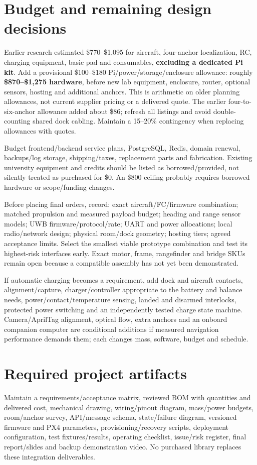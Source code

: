 \documentclass[10pt,letterpaper]{article}
\begin{document}
\section{Budget and remaining design decisions}
Earlier research estimated \$770--\$1,095 for aircraft, four-anchor localization, RC, charging equipment, basic pad and consumables, \textbf{excluding a dedicated Pi kit}. Add a provisional \$100--\$180 Pi/power/storage/enclosure allowance: roughly \textbf{\$870--\$1,275 hardware}, before new lab equipment, enclosure, router, optional sensors, hosting and additional anchors. This is arithmetic on older planning allowances, not current supplier pricing or a delivered quote. The earlier four-to-six-anchor allowance added about \$86; refresh all listings and avoid double-counting shared dock cabling. Maintain a 15--20\% contingency when replacing allowances with quotes.

Budget frontend/backend service plans, PostgreSQL, Redis, domain renewal, backups/log storage, shipping/taxes, replacement parts and fabrication. Existing university equipment and credits should be listed as borrowed/provided, not silently treated as purchased for \$0. An \$800 ceiling probably requires borrowed hardware or scope/funding changes.

Before placing final orders, record: exact aircraft/FC/firmware combination; matched propulsion and measured payload budget; heading and range sensor models; UWB firmware/protocol/rate; UART and power allocations; local radio/network design; physical room/dock geometry; hosting tiers; agreed acceptance limits. Select the smallest viable prototype combination and test its highest-risk interfaces early. Exact motor, frame, rangefinder and bridge SKUs remain open because a compatible assembly has not yet been demonstrated.

If automatic charging becomes a requirement, add dock and aircraft contacts, alignment/capture, charger/controller appropriate to the battery and balance needs, power/contact/temperature sensing, landed and disarmed interlocks, protected power switching and an independently tested charge state machine. Camera/AprilTag alignment, optical flow, extra anchors and an onboard companion computer are conditional additions if measured navigation performance demands them; each changes mass, software, budget and schedule.

\section{Required project artifacts}
Maintain a requirements/acceptance matrix, reviewed BOM with quantities and delivered cost, mechanical drawing, wiring/pinout diagram, mass/power budgets, room/anchor survey, API/message schema, state/failure diagram, versioned firmware and PX4 parameters, provisioning/recovery scripts, deployment configuration, test fixtures/results, operating checklist, issue/risk register, final report/slides and backup demonstration video. No purchased library replaces these integration deliverables.
\end{document}
